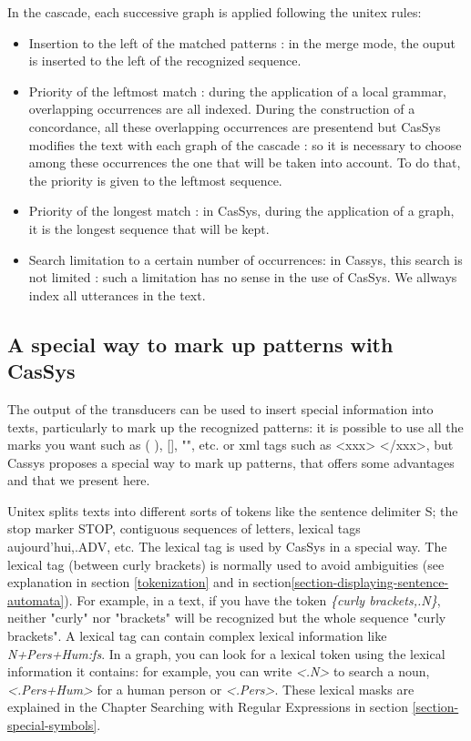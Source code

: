 In the cascade, each successive graph is applied following the unitex rules:
\begin{itemize}
	\item Insertion to the left of the matched patterns : in the merge mode, the ouput is inserted to the left of the recognized sequence.
	\item	Priority of the leftmost match : during the application of a local grammar, overlapping occurrences are all indexed. 
	During the construction of a concordance, all these overlapping occurrences are presentend but CasSys modifies the text with each 
	graph of the cascade : so it is necessary to choose among these occurrences the one that will be taken into account. To do that, the priority is given to the leftmost sequence.
	\item Priority of the longest match : in CasSys, during the application of a graph, it is the longest sequence 
	that will be kept.
	\item	Search limitation to a certain number of occurrences: in Cassys, this search is not limited : such a limitation has no sense in the use of CasSys. We allways index all utterances in the text.
\end{itemize}

\subsection{A special way to mark up patterns with CasSys}

The output of the transducers can be used to insert special information into texts, particularly to mark up the  recognized patterns: it is 
possible to use all the marks you want such as ( ), [], "", etc. or xml tags such as <xxx> </xxx>, but Cassys proposes a special way to 
mark up patterns, that offers some advantages and that we present here.  

\bigskip
\noindent Unitex splits texts into different sorts of tokens like the sentence delimiter {S}; the stop marker {STOP}, contiguous 
sequences of letters, lexical tags {aujourd'hui,.ADV}, etc. The lexical tag is used by CasSys in a special way. The lexical tag (between curly brackets) is normally used to avoid ambiguities (see explanation in section \ref{tokenization} and in section\ref{section-displaying-sentence-automata}). 
For example, in a text, if you have the token \emph{\{curly brackets,.N\}}, neither "curly" nor "brackets" will be recognized but the whole sequence 
"curly brackets". A lexical tag can contain complex lexical information like \emph{N+Pers+Hum:fs}.
In a graph, you can look for a lexical token using the lexical information it contains: for example, you can write \emph{<.N>} to search 
a noun, \emph{<.Pers+Hum>} for a human person or \emph{<.Pers>}. These lexical masks are explained in the Chapter Searching with Regular Expressions in section \ref{section-special-symbols}.
 
